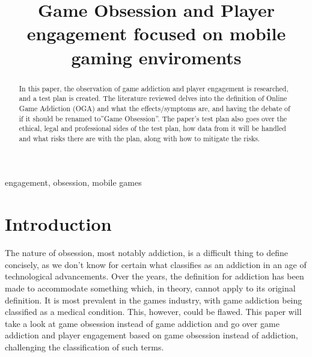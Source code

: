 \documentclass[conference]{IEEEtran}
\begin{document}
\title{Game Obsession and Player engagement focused on mobile gaming enviroments\\
}

\author{
}

\maketitle



\begin{abstract}
In this paper, the observation of game addiction and player engagement is researched, and a test plan is created. The literature reviewed delves into the definition of Online Game Addiction (OGA) and what the effects/symptoms are, and having the debate of if it should be renamed to”Game Obsession”. The paper’s test plan also goes over the ethical, legal and professional sides of the test plan, how data from it will be handled and what risks there are with the plan, along with how to mitigate the risks.
\end{abstract}

\begin{IEEEkeywords}
engagement, obsession, mobile games
\end{IEEEkeywords}

\section{Introduction}
The nature of obsession, most notably addiction, is a difficult thing to define concisely, as we don't know for certain what classifies as an addiction in an age of technological advancements. Over the years, the definition for addiction has been made to accommodate something which, in theory, cannot apply to its original definition. It is most prevalent in the games industry, with game addiction being classified as a medical condition. This, however, could be flawed. This paper will take a look at game obsession instead of game addiction and go over game addiction and player engagement based on game obsession instead of addiction, challenging the classification of such terms.\\
\end{document}

